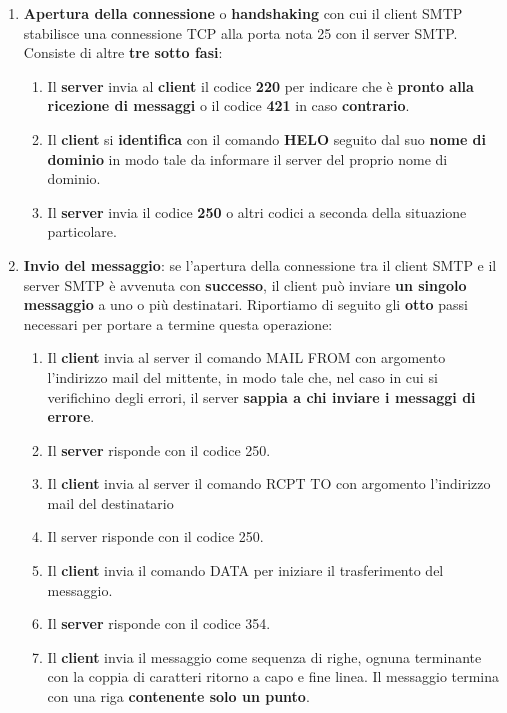 \documentclass[11pt,a4paper,oneside]{book}
\theoremstyle{definition}
\begin{document}
\begin{enumerate}
	\item \textbf{Apertura della connessione} o \textbf{handshaking} con cui il client SMTP stabilisce una connessione TCP alla porta nota 25 con il server SMTP. Consiste di altre \textbf{tre sotto fasi}:
	      \begin{enumerate}[label*=\arabic*.]
		      \item Il \textbf{server} invia al \textbf{client} il codice \textbf{220} per indicare che è \textbf{pronto alla ricezione di messaggi} o il codice \textbf{421} in caso \textbf{contrario}.
		      \item Il \textbf{client} si \textbf{identifica} con il comando \textbf{HELO} seguito dal suo \textbf{nome di dominio} in modo tale da informare il server del proprio nome di dominio.
		      \item Il \textbf{server} invia il codice \textbf{250} o altri codici a seconda della situazione particolare.
	      \end{enumerate}
	\item \textbf{Invio del messaggio}: se l'apertura della connessione tra il client SMTP e il server SMTP è avvenuta con \textbf{successo}, il client può inviare \textbf{un singolo messaggio} a uno o più destinatari. Riportiamo di seguito gli \textbf{otto} passi necessari per portare a termine questa operazione:
	      \begin{enumerate}[label*=\arabic*.]
		      \item Il \textbf{client} invia al server il comando MAIL FROM con argomento l'indirizzo mail del mittente, in modo tale che, nel caso in cui si verifichino degli  errori, il server \textbf{sappia a chi inviare i messaggi di errore}.
		      \item Il \textbf{server} risponde con il codice 250.
		      \item Il \textbf{client} invia al server il comando RCPT TO con argomento l'indirizzo mail del destinatario
		      \item Il server risponde con il codice 250.
		      \item Il \textbf{client} invia il comando DATA per iniziare il trasferimento del messaggio.
		      \item Il \textbf{server} risponde con il codice 354.
		      \item Il \textbf{client} invia il messaggio come sequenza di righe, ognuna terminante con la coppia di caratteri ritorno a capo e fine linea. Il messaggio termina con una riga \textbf{contenente solo un punto}.

\end{enumerate}
\end{enumerate}
\end{document}
